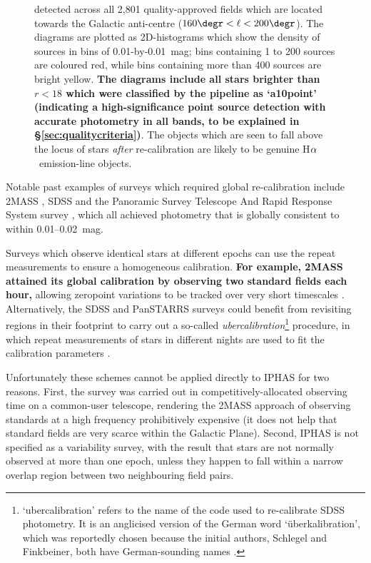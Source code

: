 \documentclass[a4paper,useAMS,usenatbib]{mn2e}
\def\ha{\mbox{H$\rm \alpha$}}
\begin{document}
\begin{figure}
{         detected across all 2,801 quality-approved fields
         which are located towards the Galactic anti-centre
         ($160\degr<\ell<200\degr$).
         The diagrams are plotted as 2D-histograms
         which show the density of sources
         in bins of 0.01-by-0.01~mag;
         bins containing 1 to 200 sources are coloured red,
         while bins containing more than 400 sources are bright yellow.
         {\bf The diagrams include all stars
         brighter than $r<18$ which were
         classified by the pipeline as `a10point'
         (indicating a high-significance point source detection with
         accurate photometry in all bands,
         to be explained in \S\ref{sec:qualitycriteria})}.
         The objects which are seen to fall above the locus of stars
         \emph{after} re-calibration 
         are likely to be genuine \ha\ emission-line objects.}
\end{figure}

Notable past examples of surveys which required
global re-calibration include 
2MASS \citep{Nikolaev2000},
SDSS \citep{Padmanabhan2008}
and the Panoramic Survey Telescope 
And Rapid Response System survey \citep[Pan-STARRS;][]{Schlafly2012},
which all achieved photometry 
that is globally consistent to within 0.01--0.02~mag.

Surveys which observe identical stars at different epochs
can use the repeat measurements to ensure a homogeneous calibration.
{\bf For example, 2MASS attained its global calibration
by observing two standard fields each hour, }
allowing zeropoint variations to be tracked 
over very short timescales \citep{Nikolaev2000}.
Alternatively, the SDSS and PanSTARRS surveys could benefit
from revisiting regions in their footprint to 
carry out a so-called \emph{ubercalibration}\footnote{`ubercalibration'
refers to the name of the code used to re-calibrate SDSS photometry. 
It is an anglicised version of the German word `\"uberkalibration',
which was reportedly chosen because the initial authors, Schlegel and Finkbeiner, both
have German-sounding names \citep{Finkbeiner2010}.} procedure,
in which repeat measurements of stars in different nights
are used to fit the calibration parameters
\citep{Ivezic2007,Padmanabhan2008,Schlafly2012}.

Unfortunately these schemes cannot be applied
directly to IPHAS
for two reasons. 
First, the survey was carried out 
in competitively-allocated observing time on a
common-user telescope, 
rendering the 2MASS approach 
of observing standards at a high frequency
prohibitively expensive (it does not help that 
standard fields are very scarce within the Galactic Plane).
Second, IPHAS is not specified as a variability survey,
with the result that stars are not normally observed
at more than one epoch,
unless they happen to fall within a narrow overlap region 
between two neighbouring field pairs.
\end{document}
